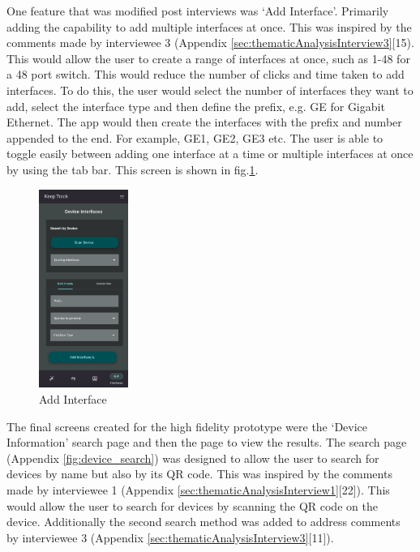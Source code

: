 \documentclass [11pt,a4paper]{article}
\begin{document}
One feature that was modified post interviews was `Add Interface'. Primarily adding the capability to add multiple interfaces at once. This was inspired by the comments made by interviewee 3 (Appendix \ref{sec:thematicAnalysisInterview3}[15). This would allow the user to create a range of interfaces at once, such as 1-48 for a 48 port switch. This would reduce the number of clicks and time taken to add interfaces. To do this, the user would select the number of interfaces they want to add, select the interface type and then define the prefix, e.g. GE for Gigabit Ethernet. The app would then create the interfaces with the prefix and number appended to the end. For example, GE1, GE2, GE3 etc. The user is able to toggle easily between adding one interface at a time or multiple interfaces at once by using the tab bar. This screen is shown in fig.\ref{fig:interface_add}.

\begin{figure}
    \centering
    \includegraphics[width=0.26\textwidth]{images/interface_add.png}
    \caption{Add Interface}
    \label{fig:interface_add}
\end{figure}

The final screens created for the high fidelity prototype were the `Device Information' search page and then the page to view the results. The search page (Appendix \ref{fig:device_search}) was designed to allow the user to search for devices by name but also by its QR code. This was inspired by the comments made by interviewee 1 (Appendix \ref{sec:thematicAnalysisInterview1}[22]). This would allow the user to search for devices by scanning the QR code on the device. Additionally the second search method was added to address comments by interviewee 3 (Appendix \ref{sec:thematicAnalysisInterview3}[11]). 
\end{document}
